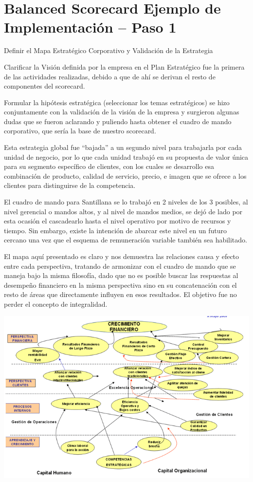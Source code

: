 \section{Balanced Scorecard Ejemplo de Implementación – Paso 1}
\item {Definir el Mapa Estratégico Corporativo y Validación de la Estrategia

Clarificar la Visión definida por la empresa en el Plan Estratégico fue la primera de las actividades realizadas, debido a que de ahí se derivan el resto de componentes del scorecard.

Formular la hipótesis estratégica (seleccionar los temas estratégicos) se hizo conjuntamente con la validación de la visión de la empresa y surgieron algunas dudas que se fueron aclarando y puliendo hasta obtener el cuadro de mando corporativo, que sería la base de nuestro scorecard.

Esta estrategia global fue “bajada” a un segundo nivel para trabajarla por cada unidad de negocio, por lo que cada unidad trabajó en su propuesta de valor única para su segmento específico de clientes, con los cuales se desarrollo esa combinación de producto, calidad de servicio, precio, e imagen que se ofrece a los clientes para distinguirse de la competencia.

El cuadro de mando para Santillana se lo trabajó en 2 niveles de los 3 posibles, al nivel gerencial o mandos altos, y al nivel de mandos medios, se dejó de lado por esta ocasión el cascadearlo hasta el nivel operativo por motivo de recursos y tiempo. Sin embargo, existe la intención de abarcar este nivel en un futuro cercano una vez que el esquema de remuneración variable también sea habilitado.

El mapa aquí presentado es claro y nos demuestra las relaciones causa y efecto entre cada perspectiva, tratando de armonizar con el cuadro de mando que se maneja bajo la misma filosofía, dado que no es posible buscar las respuestas al desempeño financiero en la misma perspectiva sino en su concatenación con el resto de áreas que directamente influyen en esos resultados. El objetivo fue no perder el concepto de integralidad.}

\begin{center}
\includegraphics[width=15cm]{./Imagenes/ImagenEmpresa3.png}
\end{center}


